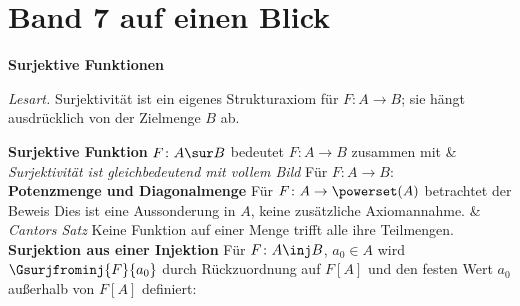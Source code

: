 \chapter[Band 7: Surjektive Funktionen]{Band 7 auf einen Blick}
\noindent\textbf{Surjektive Funktionen}\par\medskip
\noindent\emph{Lesart.} Surjektivität ist ein eigenes Strukturaxiom
für \(F\colon A\to B\); sie hängt ausdrücklich von der Zielmenge \(B\) ab.
\begin{BandUebersicht}
\textbf{Surjektive Funktion}
\(F\colon A\sur B\) bedeutet \(F\colon A\to B\) zusammen mit
&
\textit{Surjektivität ist gleichbedeutend mit vollem Bild}
Für \(F\colon A\to B\):
\\
\addlinespace[.8ex]
\textbf{Potenzmenge und Diagonalmenge}
Für \(F\colon A\to\powerset(A)\) betrachtet der Beweis
Dies ist eine Aussonderung in \(A\), keine zusätzliche Axiomannahme.
&
\textit{Cantors Satz}
Keine Funktion auf einer Menge trifft alle ihre Teilmengen.
\\
\addlinespace[.8ex]
\textbf{Surjektion aus einer Injektion}
Für \(F\colon A\inj B\), \(a_0\in A\) wird
\(\Gsurjfrominj{F}{a_0}\) durch Rückzuordnung auf \(F[A]\)
und den festen Wert \(a_0\) außerhalb von \(F[A]\) definiert:

\end{BandUebersicht}
